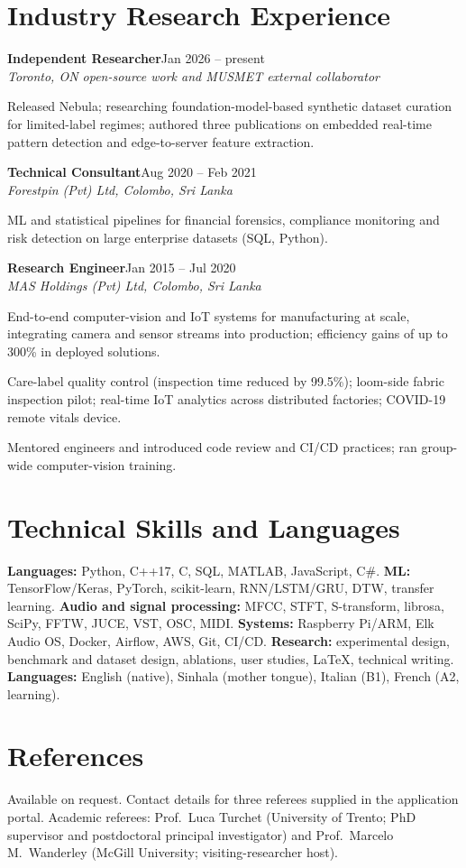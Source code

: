 \documentclass[11pt]{article}
\newcommand{\entry}[3]{%
  \par\noindent\textbf{#1}\hfill #2\\
  \noindent\textit{#3}\par\vspace{0.15em}}
\begin{document}
\section*{Industry Research Experience}
\entry{Independent Researcher}{Jan 2026 -- present}{Toronto, ON \textbar{} open-source work and MUSMET external collaborator}
\begin{cvlist}
  \item Released Nebula; researching foundation-model-based synthetic dataset curation for limited-label regimes; authored three publications on embedded real-time pattern detection and edge-to-server feature extraction.
\end{cvlist}
\entry{Technical Consultant}{Aug 2020 -- Feb 2021}{Forestpin (Pvt) Ltd, Colombo, Sri Lanka}
\begin{cvlist}
  \item ML and statistical pipelines for financial forensics, compliance monitoring and risk detection on large enterprise datasets (SQL, Python).
\end{cvlist}
\entry{Research Engineer}{Jan 2015 -- Jul 2020}{MAS Holdings (Pvt) Ltd, Colombo, Sri Lanka}
\begin{cvlist}
  \item End-to-end computer-vision and IoT systems for manufacturing at scale, integrating camera and sensor streams into production; efficiency gains of up to 300\% in deployed solutions.
  \item Care-label quality control (inspection time reduced by 99.5\%); loom-side fabric inspection pilot; real-time IoT analytics across distributed factories; COVID-19 remote vitals device.
  \item Mentored engineers and introduced code review and CI/CD practices; ran group-wide computer-vision training.
\end{cvlist}

\section*{Technical Skills and Languages}
\textbf{Languages:} Python, C++17, C, SQL, MATLAB, JavaScript, C\#. \textbf{ML:} TensorFlow/Keras, PyTorch, scikit-learn, RNN/LSTM/GRU, DTW, transfer learning. \textbf{Audio and signal processing:} MFCC, STFT, S-transform, librosa, SciPy, FFTW, JUCE, VST, OSC, MIDI. \textbf{Systems:} Raspberry Pi/ARM, Elk Audio OS, Docker, Airflow, AWS, Git, CI/CD. \textbf{Research:} experimental design, benchmark and dataset design, ablations, user studies, LaTeX, technical writing. \textbf{Languages:} English (native), Sinhala (mother tongue), Italian (B1), French (A2, learning).

\section*{References}
Available on request. Contact details for three referees supplied in the application portal. Academic referees: Prof.\ Luca Turchet (University of Trento; PhD supervisor and postdoctoral principal investigator) and Prof.\ Marcelo M.\ Wanderley (McGill University; visiting-researcher host).
\end{document}
